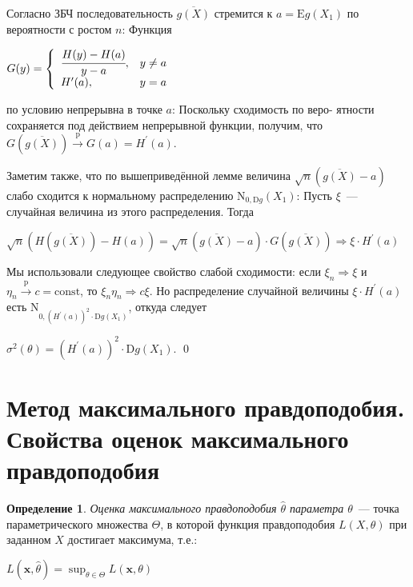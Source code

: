 \documentclass[oneside,final,14pt]{extreport}
\renewenvironment{proof}{{\bfseries Доказательство.}}{\qed}
\theoremstyle{definition}
\newtheorem{defn}{Определение}[section]
\begin{document}
\begin{proof}
Согласно ЗБЧ последовательность \(\overline{g(X)}\) стремится к \(a=\mathrm{E} g\left(X_{1}\right)\) по вероятности с ростом \(n\): Функция

\(G(y)=\left\{\begin{array}{ll}
\cfrac{H(y)-H(a)}{y-a}, & y \neq a \\
H^{\prime}(a), & y=a
\end{array}\right.\)

по условию непрерывна в точке \(a\): Поскольку сходимость по веро-
ятности сохраняется под действием непрерывной функции, получим,
что \(G(\overline{g(X)}) \stackrel{\mathrm{p}}{\longrightarrow} G(a)=H^{\prime}(a)\).

Заметим также, что по вышеприведённой лемме величина \(\sqrt{n}(\overline{g(X)}-a)\) слабо сходится
к нормальному распределению \(\mathrm{N}_{0, \mathrm{D} g}\left(X_{1}\right)\): Пусть \(\xi\)~--- случайная величина
из этого распределения. Тогда

\(\sqrt{n}(H(\overline{g(X)})-H(a))=\sqrt{n}(\overline{g(X)}-a) \cdot G(\overline{g(X)}) \Rightarrow \xi \cdot H^{\prime}(a)\)

Мы использовали следующее свойство слабой сходимости: если \(\xi_{n} \Rightarrow \xi\) и \(\eta_{n} \stackrel{\mathrm{p}}{\longrightarrow} c=\mathrm{const}\), то \(\xi_{n} \eta_{n} \Rightarrow c \xi\). Но распределение случайной величины \(\xi \cdot H^{\prime}(a)\) есть \(\mathrm{N}_{0,\left(H^{\prime}(a)\right)^{2} \cdot \mathrm{D} g\left(X_{1}\right)}\), откуда следует

\(\sigma^{2}(\theta)=\left(H^{\prime}(a)\right)^{2} \cdot \mathrm{D} g\left(X_{1}\right)\).
\end{proof}

\section{Метод максимального правдоподобия. Свойства оценок максимального правдоподобия}

\begin{defn}
{\it Оценка максимального правдоподобия \(\hat{\theta}\) параметра \(\theta\)}~--- точка параметрического множества \(\Theta\), в которой функция правдоподобия \(L(X,\theta)\) при заданном \(X\) достигает максимума, т.е.:

\( L(\boldsymbol{x}, \hat{\theta})=\sup _{\theta \in \Theta} L(\boldsymbol{x}, \theta) \)
\end{defn}
\end{document}
